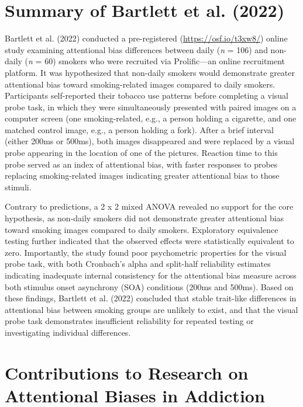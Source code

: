\documentclass[authordate, reflection, issue]{jote-new-article}
\begin{document}
	\section{Summary of Bartlett et al. (2022)}



	Bartlett et al. (2022) conducted a pre-registered (\url{https://osf.io/t3xw8/}) online study examining attentional bias differences between daily (\emph{n} = 106) and non-daily (\emph{n} = 60) smokers who were recruited via Prolific—an online recruitment platform. It was hypothesized that non-daily smokers would demonstrate greater attentional bias toward smoking-related images compared to daily smokers. Participants self-reported their tobacco use patterns before completing a visual probe task, in which they were simultaneously presented with paired images on a computer screen (one smoking-related, e.g., a person holding a cigarette, and one matched control image, e.g., a person holding a fork). After a brief interval (either 200ms or 500ms), both images disappeared and were replaced by a visual probe appearing in the location of one of the pictures. Reaction time to this probe served as an index of attentional bias, with faster responses to probes replacing smoking-related images indicating greater attentional bias to those stimuli.



	Contrary to predictions, a 2 x 2 mixed ANOVA revealed no support for the core hypothesis, as non-daily smokers did not demonstrate greater attentional bias toward smoking images compared to daily smokers. Exploratory equivalence testing further indicated that the observed effects were statistically equivalent to zero. Importantly, the study found poor psychometric properties for the visual probe task, with both Cronbach's alpha and split-half reliability estimates indicating inadequate internal consistency for the attentional bias measure across both stimulus onset asynchrony (SOA) conditions (200ms and 500ms). Based on these findings, Bartlett et al. (2022) concluded that stable trait-like differences in attentional bias between smoking groups are unlikely to exist, and that the visual probe task demonstrates insufficient reliability for repeated testing or investigating individual differences.



	\section{Contributions to Research on Attentional Biases in Addiction}
\end{document}
